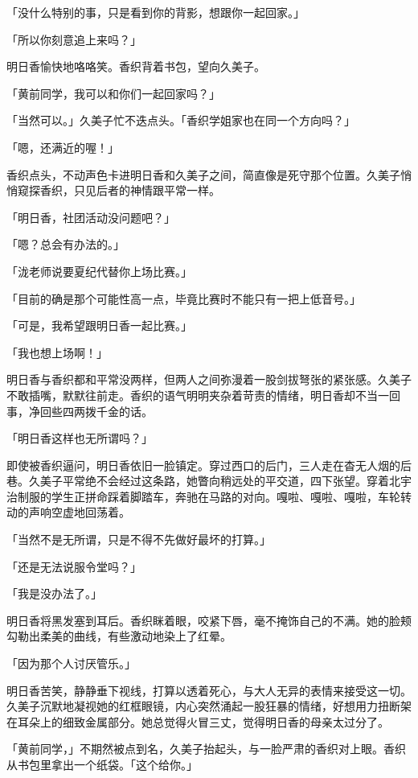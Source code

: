 \documentclass[UTF8]{ctexart}
\begin{document}
    「没什么特别的事，只是看到你的背影，想跟你一起回家。」 

    「所以你刻意追上来吗？」 

    明日香愉快地咯咯笑。香织背着书包，望向久美子。 

    「黄前同学，我可以和你们一起回家吗？」 

    「当然可以。」久美子忙不迭点头。「香织学姐家也在同一个方向吗？」 

    「嗯，还满近的喔！」 

    香织点头，不动声色卡进明日香和久美子之间，简直像是死守那个位置。久美子悄悄窥探香织，只见后者的神情跟平常一样。 

    「明日香，社团活动没问题吧？」 

    「嗯？总会有办法的。」 

    「泷老师说要夏纪代替你上场比赛。」 

    「目前的确是那个可能性高一点，毕竟比赛时不能只有一把上低音号。」 

    「可是，我希望跟明日香一起比赛。」 

    「我也想上场啊！」 

    明日香与香织都和平常没两样，但两人之间弥漫着一股剑拔弩张的紧张感。久美子不敢插嘴，默默往前走。香织的语气明明夹杂着苛责的情绪，明日香却不当一回事，净回些四两拨千金的话。 

    「明日香这样也无所谓吗？」 

    即使被香织逼问，明日香依旧一脸镇定。穿过西口的后门，三人走在杳无人烟的后巷。久美子平常绝不会经过这条路，她瞥向稍远处的平交道，四下张望。穿着北宇治制服的学生正拼命踩着脚踏车，奔驰在马路的对向。嘎啦、嘎啦、嘎啦，车轮转动的声响空虚地回荡着。 

    「当然不是无所谓，只是不得不先做好最坏的打算。」 

    「还是无法说服令堂吗？」 

    「我是没办法了。」 

    明日香将黑发塞到耳后。香织眯着眼，咬紧下唇，毫不掩饰自己的不满。她的脸颊勾勒出柔美的曲线，有些激动地染上了红晕。 

    「因为那个人讨厌管乐。」 

    明日香苦笑，静静垂下视线，打算以透着死心，与大人无异的表情来接受这一切。久美子沉默地凝视她的红框眼镜，内心突然涌起一股狂暴的情绪，好想用力扭断架在耳朵上的细致金属部分。她总觉得火冒三丈，觉得明日香的母亲太过分了。 

    「黄前同学，」不期然被点到名，久美子抬起头，与一脸严肃的香织对上眼。香织从书包里拿出一个纸袋。「这个给你。」 
\end{document}
